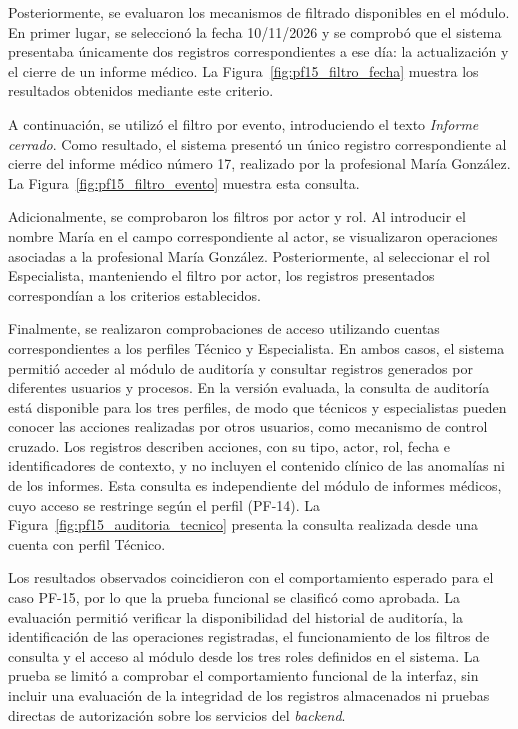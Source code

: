 Posteriormente, se evaluaron los mecanismos de filtrado disponibles en el módulo. En primer lugar, se seleccionó la fecha 10/11/2026 y se comprobó que el sistema presentaba únicamente dos registros correspondientes a ese día: la actualización y el cierre de un informe médico. La Figura~\ref{fig:pf15_filtro_fecha} muestra los resultados obtenidos mediante este criterio.

A continuación, se utilizó el filtro por evento, introduciendo el texto \textit{Informe cerrado}. Como resultado, el sistema presentó un único registro correspondiente al cierre del informe médico número 17, realizado por la profesional María González. La Figura~\ref{fig:pf15_filtro_evento} muestra esta consulta.

Adicionalmente, se comprobaron los filtros por actor y rol. Al introducir el nombre María en el campo correspondiente al actor, se visualizaron operaciones asociadas a la profesional María González. Posteriormente, al seleccionar el rol Especialista, manteniendo el filtro por actor, los registros presentados correspondían a los criterios establecidos.

Finalmente, se realizaron comprobaciones de acceso utilizando cuentas correspondientes a los perfiles Técnico y Especialista. En ambos casos, el sistema permitió acceder al módulo de auditoría y consultar registros generados por diferentes usuarios y procesos. En la versión evaluada, la consulta de auditoría está disponible para los tres perfiles, de modo que técnicos y especialistas pueden conocer las acciones realizadas por otros usuarios, como mecanismo de control cruzado. Los registros describen acciones, con su tipo, actor, rol, fecha e identificadores de contexto, y no incluyen el contenido clínico de las anomalías ni de los informes. Esta consulta es independiente del módulo de informes médicos, cuyo acceso se restringe según el perfil (PF-14). La Figura~\ref{fig:pf15_auditoria_tecnico} presenta la consulta realizada desde una cuenta con perfil Técnico.

Los resultados observados coincidieron con el comportamiento esperado para el caso PF-15, por lo que la prueba funcional se clasificó como aprobada. La evaluación permitió verificar la disponibilidad del historial de auditoría, la identificación de las operaciones registradas, el funcionamiento de los filtros de consulta y el acceso al módulo desde los tres roles definidos en el sistema. La prueba se limitó a comprobar el comportamiento funcional de la interfaz, sin incluir una evaluación de la integridad de los registros almacenados ni pruebas directas de autorización sobre los servicios del \textit{backend}.


